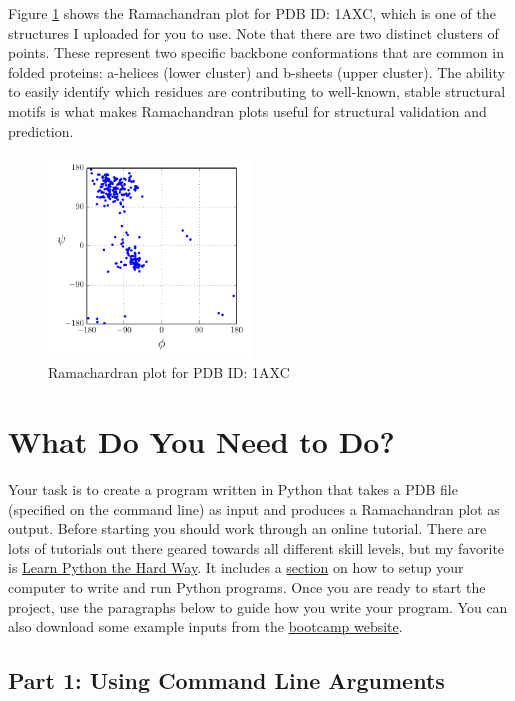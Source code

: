 \documentclass{article}
\newcommand{\ahelices}{\textgreek{a}-helices}
\newcommand{\bsheets}{\textgreek{b}-sheets}
\begin{document}
Figure \ref{fig:example-plot} shows the Ramachandran plot for PDB ID: 1AXC, 
which is one of the structures I uploaded for you to use.  Note that there are 
two distinct clusters of points.  These represent two specific backbone 
conformations that are common in folded proteins: \ahelices{} (lower cluster) 
and \bsheets{} (upper cluster).  The ability to easily identify which residues 
are contributing to well-known, stable structural motifs is what makes 
Ramachandran plots useful for structural validation and prediction. 

\begin{figure}
 \centering
 \includegraphics[width=0.48\textwidth]{example-plot}
 \caption{Ramachardran plot for PDB ID: 1AXC}
 \label{fig:example-plot}
\end{figure}

\section{What Do You Need to Do?}

Your task is to create a program written in Python that takes a PDB file 
(specified on the command line) as input and produces a Ramachandran plot as 
output.  Before starting you should work through an online tutorial.  There are 
lots of tutorials out there geared towards all different skill levels, but my 
favorite is \href{http://learnpythonthehardway.org/book}{Learn Python the Hard 
Way}.  It  includes  a 
\href{http://learnpythonthehardway.org/book/ex0.html}{section} on how to setup 
your computer to write and run Python programs.  Once you are ready to start 
the project, use the paragraphs below to guide how you write your  program.  
You can also download some example inputs from the
\href{http://bootcamp.ipqb.org/programming}{bootcamp website}.

\subsection{Part 1: Using Command Line Arguments}
\end{document}
